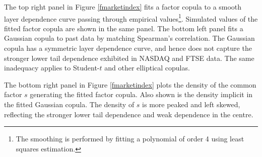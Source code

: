 \documentclass[authoryear]{elsarticle}
\newcommand{\fref}[1]{Figure \ref{#1}}
\begin{document}
The top right panel in \fref{fmarketindex} fits a factor copula to a smooth layer dependence curve passing through empirical values\footnote{The smoothing is performed by fitting a polynomial of order 4 using least squares estimation.}. Simulated values of the fitted factor copula are shown in the same panel. The bottom left panel fits a Gaussian copula to past data by matching Spearman's correlation. The Gaussian copula has a symmetric layer dependence curve, and hence does not capture the stronger lower tail dependence exhibited in NASDAQ and FTSE data. The same inadequacy applies to Student-$t$ and other elliptical copulas.

The bottom right panel in \fref{fmarketindex} plots the density of the common factor $s$ generating the fitted factor copula. Also shown is the density implicit in the fitted Gaussian copula. The density of $s$ is more peaked and left skewed, reflecting the stronger lower tail dependence and weak dependence in the centre.
\end{document}
